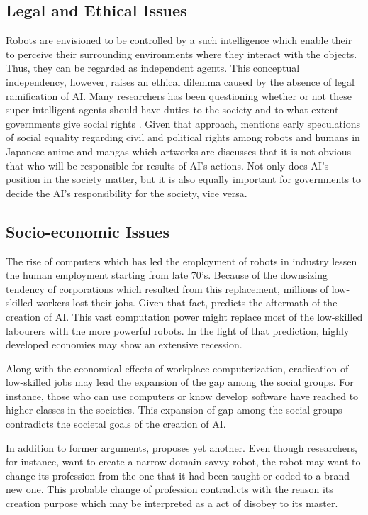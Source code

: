 \documentclass[man]{apa6}
\begin{document}
 
\subsection{Legal and Ethical Issues}
Robots are envisioned to be controlled by a such intelligence which enable their to perceive their surrounding environments where they interact with the objects. Thus, they can be regarded as independent agents.
This conceptual independency, however, raises an ethical dilemma caused by the absence of legal ramification of AI.
Many researchers has been questioning whether or not these super-intelligent agents should have duties to the society and to what extent governments give social rights \cite{bob}.
Given that approach, \cite{kerb} mentions early speculations of social equality regarding civil and political rights among robots and humans in Japanese anime and mangas which artworks are %
 discusses that it is not obvious that who will be responsible for results of AI's actions.
Not only does AI's position in the society matter, but it is also equally important for governments to decide the AI's responsibility for the society, vice versa.

\subsection{Socio-economic Issues}
The rise of computers which has led the employment of robots in industry lessen the human employment starting from late 70's.
Because of the downsizing tendency of corporations which resulted from this replacement, millions of low-skilled workers lost their jobs.
Given that fact,  predicts the aftermath of the creation of AI.
This vast computation power might replace most of the low-skilled labourers with the more powerful robots.
In the light of that prediction, highly developed economies may show an extensive recession. \par
Along with the economical effects of workplace computerization, eradication of low-skilled jobs may lead the expansion of the gap among the social groups.
For instance, those who can use computers or know develop software have reached to higher classes in the societies.
This expansion of gap among the social groups contradicts the societal goals of the creation of AI. \par
In addition to former arguments,  proposes yet another.
Even though researchers, for instance, want to create a narrow-domain savvy robot, the robot may want to change its profession from the one that it had been taught or coded to a brand new one.
This probable change of profession contradicts with the reason its creation purpose which may be interpreted as a act of disobey to its master.
\end{document}
